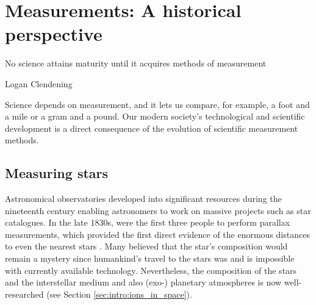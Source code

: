 \section{Measurements: A historical perspective}
\label{sec:intro:measurements}

\epigraph{No science attains maturity until it acquires methods of measurement}{Logan Clendening}

Science depends on measurement, and it lets us compare, for example, a foot and a mile or a gram and a pound. Our modern society's technological and scientific development is a direct consequence of the evolution of scientific measurement methods.

\subsection{Measuring stars}
\dropcap A{stronomical} observatories developed into significant resources during the nineteenth century enabling astronomers to work on massive projects such as star catalogues. In the late 1830s, \citet{bessel_parallax_1838, henderson_parallax_1840, struve_stellarum_1837} were the first three people to perform parallax measurements, which provided the first direct evidence of the enormous distances to even the nearest stars \cite{reid_first_2020}. Many believed that the star's composition would remain a mystery since humankind's travel to the stars was and is impossible with currently available technology. Nevertheless, the composition of the stars and the interstellar medium and also (exo-) planetary atmospheres is now well-researched (see Section \ref{sec:intro:ions_in_space}). 


